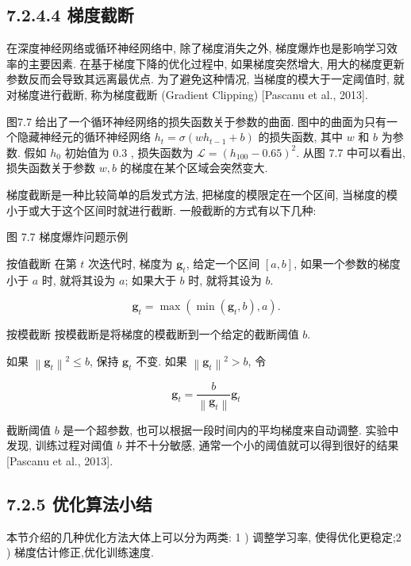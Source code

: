 \documentclass[10pt]{article}
\begin{document}
\subsection*{7.2.4.4 梯度截断}
在深度神经网络或循环神经网络中, 除了梯度消失之外, 梯度爆炸也是影响学习效率的主要因素. 在基于梯度下降的优化过程中, 如果梯度突然增大, 用大的梯度更新参数反而会导致其远离最优点. 为了避免这种情况, 当梯度的模大于一定阈值时, 就对梯度进行截断, 称为梯度截断 (Gradient Clipping) [Pascanu et al., 2013].

图7.7 给出了一个循环神经网络的损失函数关于参数的曲面. 图中的曲面为只有一个隐藏神经元的循环神经网络 $h_{t}=\sigma\left(w h_{t-1}+b\right)$ 的损失函数, 其中 $w$ 和 $b$ 为参数. 假如 $h_{0}$ 初始值为 0.3 , 损失函数为 $\mathcal{L}=\left(h_{100}-0.65\right)^{2}$. 从图 7.7 中可以看出, 损失函数关于参数 $w, b$ 的梯度在某个区域会突然变大.

梯度截断是一种比较简单的启发式方法, 把梯度的模限定在一个区间, 当梯度的模小于或大于这个区间时就进行截断. 一般截断的方式有以下几种:



图 7.7 梯度爆炸问题示例

按值截断 在第 $t$ 次迭代时, 梯度为 $\boldsymbol{g}_{t}$, 给定一个区间 $[a, b]$, 如果一个参数的梯度小于 $a$ 时, 就将其设为 $a$; 如果大于 $b$ 时, 就将其设为 $b$.


\begin{equation*}
\boldsymbol{g}_{t}=\max \left(\min \left(\boldsymbol{g}_{t}, b\right), a\right) . \tag{7.30}
\end{equation*}


按模截断 按模截断是将梯度的模截断到一个给定的截断阈值 $b$.

如果 $\left\|\boldsymbol{g}_{t}\right\|^{2} \leq b$, 保持 $\boldsymbol{g}_{t}$ 不变. 如果 $\left\|\boldsymbol{g}_{t}\right\|^{2}>b$, 令


\begin{equation*}
\boldsymbol{g}_{t}=\frac{b}{\left\|\boldsymbol{g}_{t}\right\|} \boldsymbol{g}_{t} \tag{7.31}
\end{equation*}


截断阈值 $b$ 是一个超参数, 也可以根据一段时间内的平均梯度来自动调整. 实验中发现, 训练过程对阈值 $b$ 并不十分敏感, 通常一个小的阈值就可以得到很好的结果 [Pascanu et al., 2013].

\subsection*{7.2.5 优化算法小结}
本节介绍的几种优化方法大体上可以分为两类: 1 ) 调整学习率, 使得优化更稳定;2 ) 梯度估计修正,优化训练速度.
\end{document}
